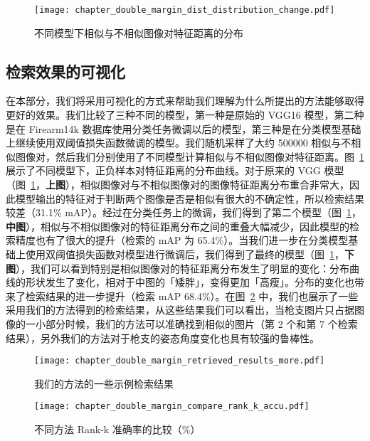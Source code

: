 \begin{figure}[t]
	\centering
	\texttt{[image: chapter\_double\_margin\_dist\_distribution\_change.pdf]}
	\caption{不同模型下相似与不相似图像对特征距离的分布}
	\label{fig:feat_dist_distribution_change}
\end{figure}

\subsection{检索效果的可视化}
在本部分，我们将采用可视化的方式来帮助我们理解为什么所提出的方法能够取得更好的效果。我们比较了三种不同的模型，第一种是原始的 VGG16 模型，第二种是在 Firearm14k 数据库使用分类任务微调以后的模型，第三种是在分类模型基础上继续使用双阈值损失函数微调的模型。我们随机采样了大约 500000 相似与不相似图像对，然后我们分别使用了不同模型计算相似与不相似图像对特征距离。图~\ref{fig:feat_dist_distribution_change} 展示了不同模型下，正负样本对特征距离的分布曲线。对于原来的 VGG 模型（图~\ref{fig:feat_dist_distribution_change}，\textbf{上图}），相似图像对与不相似图像对的图像特征距离分布重合非常大，因此模型输出的特征对于判断两个图像是否是相似有很大的不确定性，所以检索结果较差（31.1\% mAP）。经过在分类任务上的微调，我们得到了第二个模型（图~\ref{fig:feat_dist_distribution_change}，\textbf{中图}），相似与不相似图像对的特征距离分布之间的重叠大幅减少，因此模型的检索精度也有了很大的提升（检索的 mAP 为 65.4\%）。当我们进一步在分类模型基础上使用双阈值损失函数对模型进行微调后，我们得到了最终的模型（图~\ref{fig:feat_dist_distribution_change}，\textbf{下图}），我们可以看到特别是相似图像对的特征距离分布发生了明显的变化：分布曲线的形状发生了变化，相对于中图的「矮胖」，变得更加「高瘦」。分布的变化也带来了检索结果的进一步提升（检索 mAP 68.4\%）。在图~\ref{fig:double_margin_retrieval_result} 中，我们也展示了一些采用我们的方法得到的检索结果，从这些结果我们可以看出，当枪支图片只占据图像的一小部分时候，我们的方法可以准确找到相似的图片（第 2 个和第 7 个检索结果），另外我们的方法对于枪支的姿态角度变化也具有较强的鲁棒性。

\begin{figure}[t]
	\centering
	\texttt{[image: chapter\_double\_margin\_retrieved\_results\_more.pdf]}
	\caption{我们的方法的一些示例检索结果}
	\label{fig:double_margin_retrieval_result}
\end{figure}


\begin{figure}[t]
	\centering
	\texttt{[image: chapter\_double\_margin\_compare\_rank\_k\_accu.pdf]}
	\caption{不同方法 Rank-k 准确率的比较（\%）}
	\label{fig:rank_k_accuracy_compare}
\end{figure}

